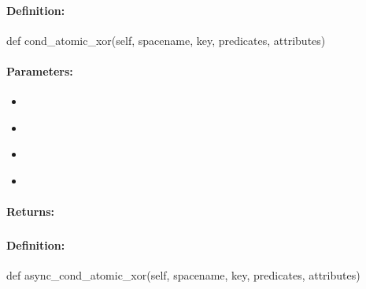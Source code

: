\paragraph{Definition:}
\begin{pythoncode}
def cond_atomic_xor(self, spacename, key, predicates, attributes)
\end{pythoncode}

\paragraph{Parameters:}
\begin{itemize}[noitemsep]
\item {}\\

\item {}\\

\item {}\\

\item {}\\

\end{itemize}

\paragraph{Returns:}


\pagebreak
\subsubsection{}
\label{api:python:async_cond_atomic_xor}


\paragraph{Definition:}
\begin{pythoncode}
def async_cond_atomic_xor(self, spacename, key, predicates, attributes)
\end{pythoncode}

